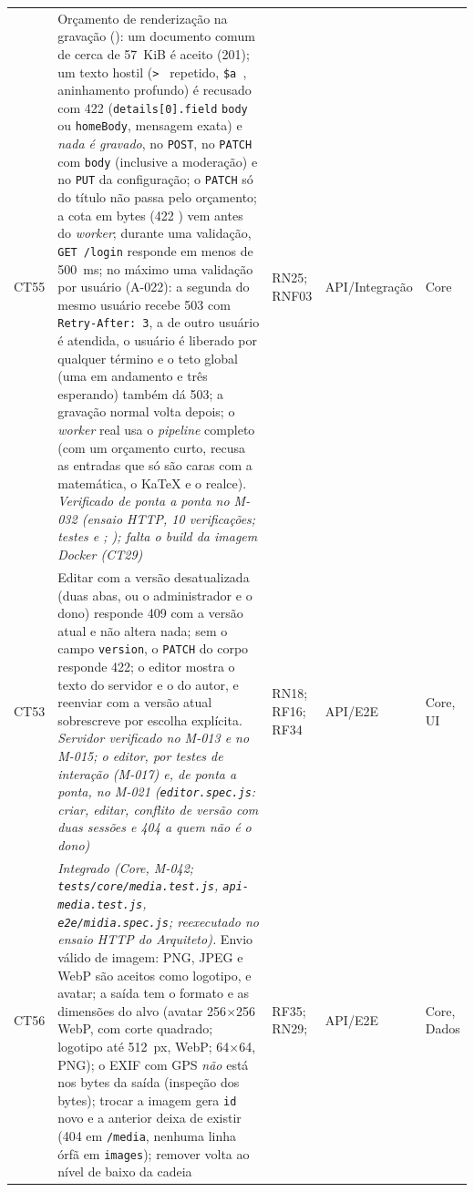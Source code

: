 \begin{longtable}{@{}L{1.1cm}L{7.0cm}L{2.2cm}L{1.6cm}L{1.6cm}@{}}
CT55 & Orçamento de renderização na gravação (): um documento comum de cerca de 57~KiB é aceito (201); um texto hostil (\texttt{> } repetido, \texttt{\$a }, aninhamento profundo) é recusado com 422  (\texttt{details[0].field} \texttt{body} ou \texttt{homeBody}, mensagem exata) e \emph{nada é gravado}, no \texttt{POST}, no \texttt{PATCH} com \texttt{body} (inclusive a moderação) e no \texttt{PUT} da configuração; o \texttt{PATCH} só do título não passa pelo orçamento; a cota em bytes (422 ) vem antes do \emph{worker}; durante uma validação, \texttt{GET /login} responde em menos de 500~ms; no máximo uma validação por usuário (A-022): a segunda do mesmo usuário recebe 503  com \texttt{Retry-After: 3}, a de outro usuário é atendida, o usuário é liberado por qualquer término e o teto global (uma em andamento e três esperando) também dá 503; a gravação normal volta depois; o \emph{worker} real usa o \emph{pipeline} completo (com um orçamento curto, recusa as entradas que só são caras com a matemática, o KaTeX e o realce). \emph{Verificado de ponta a ponta no M-032 (ensaio HTTP, 10 verificações; testes  e ; ); falta o \emph{build} da imagem Docker (CT29)} & RN25; RNF03 & API/Integração & Core\\[2pt]
CT53 & Editar com a versão desatualizada (duas abas, ou o administrador e o dono) responde 409  com a versão atual e não altera nada; sem o campo \texttt{version}, o \texttt{PATCH} do corpo responde 422; o editor mostra o texto do servidor e o do autor, e reenviar com a versão atual sobrescreve por escolha explícita. \emph{Servidor verificado no M-013 e no M-015; o editor, por testes de interação (M-017) e, de ponta a ponta, no M-021 (\texttt{editor.spec.js}: criar, editar, conflito de versão com duas sessões e 404 a quem não é o dono)} & RN18; RF16; RF34 & API/E2E & Core, UI\\[2pt]
CT56 & \emph{Integrado (Core, M-042; \texttt{tests/core/media.test.js}, \texttt{api-media.test.js}, \texttt{e2e/midia.spec.js}; reexecutado no ensaio HTTP do Arquiteto).} Envio válido de imagem: PNG, JPEG e WebP são aceitos como logotipo,  e avatar; a saída tem o formato e as dimensões do alvo (avatar 256$\times$256 WebP, com corte quadrado; logotipo até 512~px, WebP;  64$\times$64, PNG); o EXIF com GPS \emph{não} está nos bytes da saída (inspeção dos bytes); trocar a imagem gera \texttt{id} novo e a anterior deixa de existir (404 em \texttt{/media}, nenhuma linha órfã em \texttt{images}); remover volta ao nível de baixo da cadeia & RF35; RN29;  & API/E2E & Core, Dados\\[2pt]

\end{longtable}
